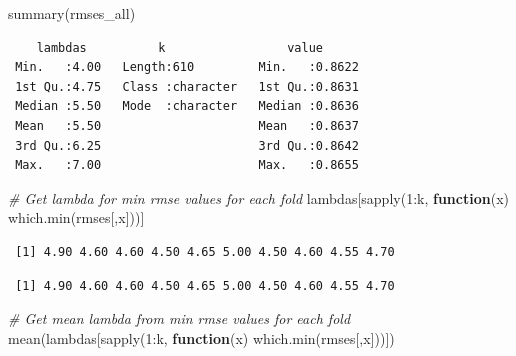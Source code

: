 \documentclass[
]{article}
\newenvironment{Shaded}{}{}
\newcommand{\CommentTok}[1]{\textcolor[rgb]{0.38,0.63,0.69}{\textit{#1}}}
\newcommand{\ControlFlowTok}[1]{\textcolor[rgb]{0.00,0.44,0.13}{\textbf{#1}}}
\newcommand{\DecValTok}[1]{\textcolor[rgb]{0.25,0.63,0.44}{#1}}
\newcommand{\FunctionTok}[1]{\textcolor[rgb]{0.02,0.16,0.49}{#1}}
\newcommand{\NormalTok}[1]{#1}
\newcommand{\SpecialCharTok}[1]{\textcolor[rgb]{0.25,0.44,0.63}{#1}}
\begin{document}
\begin{Shaded}
\begin{Highlighting}[]
\FunctionTok{summary}\NormalTok{(rmses\_all)}
\end{Highlighting}
\end{Shaded}

\begin{verbatim}
    lambdas          k                 value       
 Min.   :4.00   Length:610         Min.   :0.8622  
 1st Qu.:4.75   Class :character   1st Qu.:0.8631  
 Median :5.50   Mode  :character   Median :0.8636  
 Mean   :5.50                      Mean   :0.8637  
 3rd Qu.:6.25                      3rd Qu.:0.8642  
 Max.   :7.00                      Max.   :0.8655  
\end{verbatim}

\begin{Shaded}
\begin{Highlighting}[]
\CommentTok{\# Get lambda for min rmse values for each fold}
\NormalTok{lambdas[}\FunctionTok{sapply}\NormalTok{(}\DecValTok{1}\SpecialCharTok{:}\NormalTok{k, }\ControlFlowTok{function}\NormalTok{(x) }\FunctionTok{which.min}\NormalTok{(rmses[,x]))]}
\end{Highlighting}
\end{Shaded}

\begin{verbatim}
 [1] 4.90 4.60 4.60 4.50 4.65 5.00 4.50 4.60 4.55 4.70
\end{verbatim}

\begin{Shaded}
\end{Shaded}

\begin{verbatim}
 [1] 4.90 4.60 4.60 4.50 4.65 5.00 4.50 4.60 4.55 4.70
\end{verbatim}

\begin{Shaded}
\begin{Highlighting}[]
\CommentTok{\# Get mean lambda from min rmse values for each fold}
\FunctionTok{mean}\NormalTok{(lambdas[}\FunctionTok{sapply}\NormalTok{(}\DecValTok{1}\SpecialCharTok{:}\NormalTok{k, }\ControlFlowTok{function}\NormalTok{(x) }\FunctionTok{which.min}\NormalTok{(rmses[,x]))])}
\end{Highlighting}
\end{Shaded}
\end{document}
